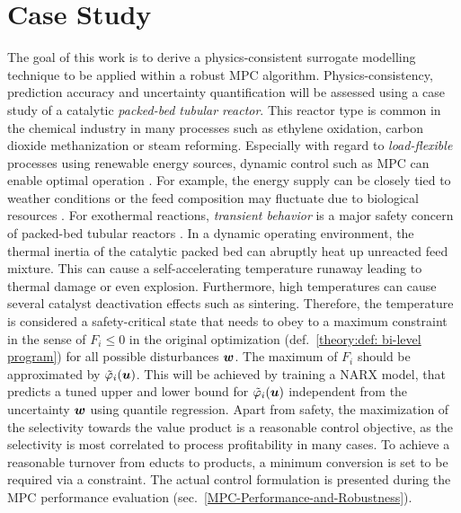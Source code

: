 \chapter{Case Study}

The goal of this work is to derive a physics-consistent surrogate modelling technique to be applied within a robust MPC algorithm.
Physics-consistency, prediction accuracy and uncertainty quantification will be assessed using a case study of a catalytic \emph{packed-bed tubular reactor}.
This reactor type is common in the chemical industry in many processes such as ethylene oxidation, carbon dioxide methanization or steam reforming.
Especially with regard to \emph{load-flexible} processes using renewable energy sources, dynamic control such as MPC can enable optimal operation \cite{fischer2021}.
For example, the energy supply can be closely tied to weather conditions or the feed composition may fluctuate due to
biological resources \cite{dittmer2022}.
\newline
\newline
For exothermal reactions, \emph{transient behavior} is a major safety concern of packed-bed tubular reactors \cite{guttel2021}.
In a dynamic operating environment, the thermal inertia of the catalytic packed bed can abruptly heat up unreacted feed mixture.
This can cause a self-accelerating temperature runaway leading to thermal damage or even explosion.
Furthermore, high temperatures can cause several catalyst deactivation effects such as sintering. Therefore, the temperature
is considered a safety-critical state that needs to obey to a maximum constraint in the sense of $F_i \leq 0$ in the original optimization (def.~\ref{theory:def: bi-level program}) for all possible disturbances ${\bm{w}}$.
The maximum of $F_i$ should be approximated by $\tilde{\varphi}_i({\bm{u}})$. This will be achieved by training a NARX model, that predicts
a tuned upper and lower bound for $\tilde{\varphi}_i({\bm{u}})$ independent from the uncertainty ${\bm{w}}$ using quantile regression.
Apart from safety, the maximization of the selectivity towards the value product is a reasonable control objective, as the selectivity
is most correlated to process profitability in many cases. To achieve a reasonable turnover from educts to products, a minimum 
conversion is set to be required via a constraint. The actual control formulation is presented during the
MPC performance evaluation (sec.~\ref{MPC-Performance-and-Robustness}). 

